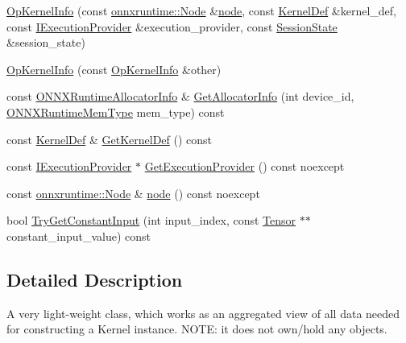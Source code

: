 \begin{DoxyCompactItemize}
\item 
\mbox{\hyperlink{classonnxruntime_1_1OpKernelInfo_a6f4103663e7050bfe536c53526e42438}{Op\+Kernel\+Info}} (const \mbox{\hyperlink{classonnxruntime_1_1Node}{onnxruntime\+::\+Node}} \&\mbox{\hyperlink{classonnxruntime_1_1OpKernelInfo_add4a38936cf8fc4f2f1c44eb8faaf75a}{node}}, const \mbox{\hyperlink{classonnxruntime_1_1KernelDef}{Kernel\+Def}} \&kernel\+\_\+def, const \mbox{\hyperlink{classonnxruntime_1_1IExecutionProvider}{I\+Execution\+Provider}} \&execution\+\_\+provider, const \mbox{\hyperlink{classonnxruntime_1_1SessionState}{Session\+State}} \&session\+\_\+state)
\item 
\mbox{\hyperlink{classonnxruntime_1_1OpKernelInfo_a36d5960e8efcd27e25f92006da9c04e4}{Op\+Kernel\+Info}} (const \mbox{\hyperlink{classonnxruntime_1_1OpKernelInfo}{Op\+Kernel\+Info}} \&other)
\item 
const \mbox{\hyperlink{structONNXRuntimeAllocatorInfo}{O\+N\+N\+X\+Runtime\+Allocator\+Info}} \& \mbox{\hyperlink{classonnxruntime_1_1OpKernelInfo_a64758fd2d6699e158afd926f64969a29}{Get\+Allocator\+Info}} (int device\+\_\+id, \mbox{\hyperlink{allocator__info_8h_add3f8ee3ff93395704abae71c30cab18}{O\+N\+N\+X\+Runtime\+Mem\+Type}} mem\+\_\+type) const
\item 
const \mbox{\hyperlink{classonnxruntime_1_1KernelDef}{Kernel\+Def}} \& \mbox{\hyperlink{classonnxruntime_1_1OpKernelInfo_accd44ef635dacda958a3a28c77822cb6}{Get\+Kernel\+Def}} () const
\item 
const \mbox{\hyperlink{classonnxruntime_1_1IExecutionProvider}{I\+Execution\+Provider}} $\ast$ \mbox{\hyperlink{classonnxruntime_1_1OpKernelInfo_a759a6d4a88589a5622a2f029571337f0}{Get\+Execution\+Provider}} () const noexcept
\item 
const \mbox{\hyperlink{classonnxruntime_1_1Node}{onnxruntime\+::\+Node}} \& \mbox{\hyperlink{classonnxruntime_1_1OpKernelInfo_add4a38936cf8fc4f2f1c44eb8faaf75a}{node}} () const noexcept
\item 
bool \mbox{\hyperlink{classonnxruntime_1_1OpKernelInfo_a7ae4c84bc281ec439f36966f37345ab8}{Try\+Get\+Constant\+Input}} (int input\+\_\+index, const \mbox{\hyperlink{classonnxruntime_1_1Tensor}{Tensor}} $\ast$$\ast$constant\+\_\+input\+\_\+value) const
\end{DoxyCompactItemize}


\subsection{Detailed Description}
A very light-\/weight class, which works as an aggregated view of all data needed for constructing a Kernel instance. N\+O\+TE\+: it does not own/hold any objects. 

